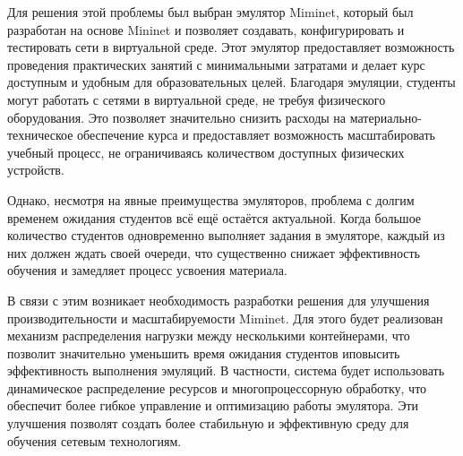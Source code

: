 Для решения этой проблемы был выбран эмулятор Miminet, который был разработан на основе Mininet и позволяет создавать, конфигурировать и тестировать сети в виртуальной среде.
Этот эмулятор предоставляет возможность проведения практических занятий с минимальными затратами и делает курс доступным и удобным для образовательных целей.
Благодаря эмуляции, студенты могут работать с сетями в виртуальной среде, не требуя физического оборудования.
Это позволяет значительно снизить расходы на материально-техническое обеспечение курса и предоставляет возможность масштабировать учебный процесс, не ограничиваясь количеством доступных физических устройств.

Однако, несмотря на явные преимущества эмуляторов, проблема с долгим временем ожидания студентов всё ещё остаётся актуальной. Когда большое количество студентов одновременно выполняет задания в эмуляторе, каждый из них должен ждать своей очереди, что существенно снижает эффективность обучения и замедляет процесс усвоения материала.

В связи с этим возникает необходимость разработки решения для улучшения производительности и масштабируемости Miminet\cite{miminet}.
Для этого будет реализован механизм распределения нагрузки между несколькими контейнерами, что позволит значительно уменьшить время ожидания студентов иповысить эффективность выполнения эмуляций.
В частности, система будет использовать динамическое распределение ресурсов и многопроцессорную обработку, что обеспечит более гибкое управление и оптимизацию работы эмулятора.
Эти улучшения позволят создать более стабильную и эффективную среду для обучения сетевым технологиям.

